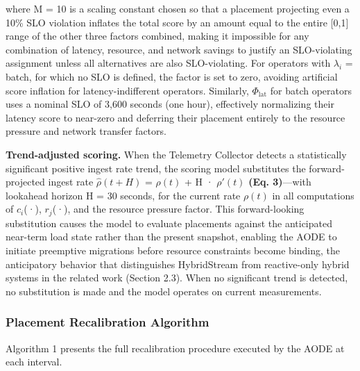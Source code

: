 \documentclass[preprint,review,12pt]{elsarticle}
\begin{document}
where M = 10 is a scaling constant chosen so that a placement projecting even a 10\% SLO violation inflates the total score by an amount equal to the entire {[}0,1{]} range of the other three factors combined, making it impossible for any combination of latency, resource, and network savings to justify an SLO-violating assignment unless all alternatives are also SLO-violating. For operators with $\lambda_i$ = batch, for which no SLO is defined, the factor is set to zero, avoiding artificial score inflation for latency-indifferent operators. Similarly, $\Phi_{\text{lat}}$ for batch operators uses a nominal SLO of 3,600 seconds (one hour), effectively normalizing their latency score to near-zero and deferring their placement entirely to the resource pressure and network transfer factors.

\textbf{Trend-adjusted scoring.} When the Telemetry Collector detects a statistically significant positive ingest rate trend, the scoring model substitutes the forward-projected ingest rate $\hat{\rho}(t+H)$ = $\rho(t)$ + H · $\rho'(t)$ \textbf{(Eq. 3)}—with lookahead horizon H = 30 seconds, for the current rate $\rho(t)$ in all computations of $c_i$(·), $r_j$(·), and the resource pressure factor. This forward-looking substitution causes the model to evaluate placements against the anticipated near-term load state rather than the present snapshot, enabling the AODE to initiate preemptive migrations before resource constraints become binding, the anticipatory behavior that distinguishes HybridStream from reactive-only hybrid systems in the related work (Section 2.3). When no significant trend is detected, no substitution is made and the model operates on current measurements.

\subsubsection{Placement Recalibration Algorithm}\label{placement-recalibration-algorithm}

Algorithm 1 presents the full recalibration procedure executed by the AODE at each interval.
\end{document}
